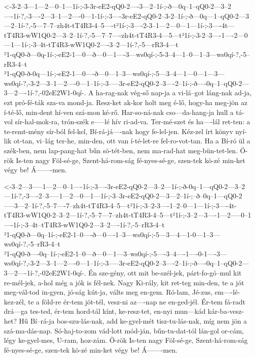   {<-3-2--3---1---2---0--1---1í-;-3-3r-eE2-qQ0-2----3---2--1í-;-ð---0q--1--qQ0-2---3--2----1í-?,-3----2---3--1---2----0---1-1í-;-3----3r-eE2-qQ0-2--3-2--1í-;-ð---0q---1--qQ0-2---3---2--1í-?,-5---7--7--zh4t-tT4R3-4--5----t²1í-;-3----2-3--1---2---0---1---1í-;-3----4t---tT4R3-wW1Q0-2---3--2--1í-?,-5---7--7----zh4t-tT4R3-4---5---t²1í-;-3-2--3----1----2---0---1---1í-;-3--4t-tT4R3-wW1Q0-2----3--2---1í-?,-5---rR3-4---t\\²1-qQ0-ð---0q-1í-;-eE2-1---0---ð---0---1----3---ws0qí-;-5-3--4---1--0---1--3---ws0qí-?,-5--rR3-4--t\\²1-qQ0-ð-0q---1í-;-eE2-1---0----ð---0---1--3---ws0qí-;-5---3--4---1---0---1---3---ws0qí-?,-3-2---3--1---2----0---1--1í-;-3-----3r-eE2-qQ0-2--3----2--1í-;-ð----0q--1--qQ0-2---3---2----1í-?,-02eE2W1-0qí-.}
  {  A ha-rag-nak vég-ső nap-ja   a vi-lá--got láng-nak ad-ja,  ezt pró-fé-ták sza-va mond-ja.   Resz-ket ak-kor holt meg é-lő,  hogy-ha meg-jön az í-té-lő,  min-dent hí-ven szá-mon ké-rő.   Har-so-ná-nak  cso---da-hang-ja     hull a tá-vol sír-hal-mok-ra,  trón-szék e-----lé    hív ri-ad-va.   Ter-mé-szet és   ha----lál ret-ten:   a te-remt-mény sír-ból fel-kel, Bí-rá-já----nak   hogy fe-lel-jen.  Kéz-zel írt könyv nyí-lik ot-tan, vi--lág ter-he, min-den, ott van     í-té-let-re fel-ro-vot-tan.     Ha a   Bí-ró    ül  a szék-ben, nem lap-pang-hat bűn sö-tét-ben,    nem ma-rad-hat meg-bün-tet-len.     Ö-rök Is-ten nagy Föl-sé-ge,  Szent-há-rom-ság fé-nyes-sé-ge,  szen-tek kö-zé  min-ket végy be!   Á-------men.}


  {<-3--2---3-----1---2---0--1----1í-;-3----3r-eE2-qQ0-2---3--2---1í-;-ð-0q--1---qQ0-2---3--2---1í-?,-3----2--3-----1---2---0---1---1í-;-3--3r-eE2-qQ0-2---3---2--1í-;--ð--0q--1---qQ0-2-----3---2--1í-?,-5--7----7--zh4t-tT4R3-4--5---t²1í-;-3--2-3----1--2--0---1---1í-;-3----4t-tT4R3-wW1Q0-2--3--2---1í-?,-5--7---7--zh4t-tT4R3-4--5---t²1í-;-3--2---3----1---2-----0--1----1í-;-3--4t--tT4R3-wW1Q0-2---3--2----1í-?,-5--rR3-4--t\\²1-qQ0-ð---0q--1í-;-eE2-1--0----ð---0----1--3---ws0qí-;-5---3---4---1-0---1--3---ws0qí-?,-5--rR3-4--t\\²1-qQ0-ð----0q--1í-;-eE2-1--0---ð---0---1---3--ws0qí-;-5----3--4----1----0-1----3---ws0qí-?,-3-2---3--1---2----0---1--1í-;-3-----3r-eE2-qQ0-2--3----2--1í-;-ð----0q--1--qQ0-2---3---2----1í-?,-02eE2W1-0qí-.}
  {  Én sze-gény, ott mit be-szél-jek, párt-fo-gó--mul kit re-mél-jek, a-hol még a   jók is fél-nek.  Nagy Ki-rály, kit ret-teg min-den, te a  jót meg-vál-tod in-gyen, jó-ság kút-ja, válts meg en-gem.  Ró-lam, Jé-zus, em----lé-kez-zél,   te a föld-re ér-tem jöt-tél, vesz-ni az----nap   ne en-ged-jél.  Ér-tem fá-radt drá---ga tes-ted,   ér-tem hord-tál kínt, ke-resz-tet, en-nyi mun---kád   kár-ba-vesz-het?  Hű Bí--rá-ja    bos-szu-lás-nak, add ke-gyel-mét tisz-tu-lás-nak,    míg nem jön a szá-ma-dás-nap.     Só-haj-to-zom   vád-lott mód-ján, bűn-tu-dat-tól lán-gol or-cám,    légy ke-gyel-mes, U-ram, hoz-zám.     Ö-rök Is-ten nagy Föl-sé-ge,  Szent-há-rom-ság fé-nyes-sé-ge,  szen-tek kö-zé  min-ket végy be!   Á-------men.}

